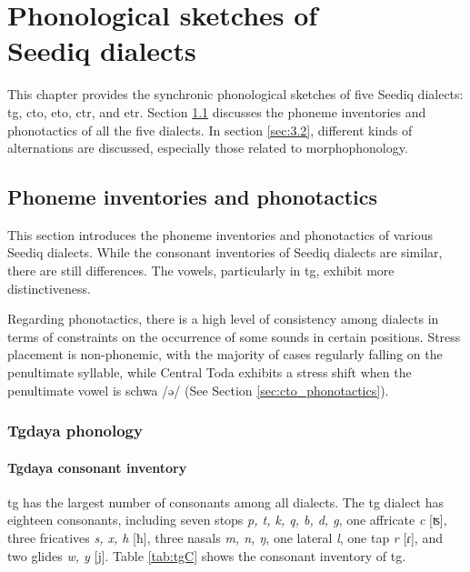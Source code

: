 \chapter[Phonological sketches of Seediq dialects]{Phonological sketches of \\ Seediq dialects}\label{ch3}

This chapter provides the synchronic phonological sketches of five Seediq dialects: \acl{tg}, \acl{cto}, \acl{eto}, \acl{ctr}, and \acl{etr}. Section \ref{sec:3.1} discusses the phoneme inventories and phonotactics of all the five dialects. In section \ref{sec:3.2}, different kinds of alternations are discussed, especially those related to morphophonology.

\section{Phoneme inventories and phonotactics} \label{sec:3.1}

This section introduces the phoneme inventories and phonotactics of various Seediq dialects. While the consonant inventories of Seediq dialects are similar, there are still differences. The vowels, particularly in \acl{tg}, exhibit more distinctiveness.

Regarding phonotactics, there is a high level of consistency among dialects in terms of constraints on the occurrence of some sounds in certain positions. Stress placement is non-phonemic, with the majority of cases regularly falling on the penultimate syllable, while Central Toda exhibits a stress shift when the penultimate vowel is schwa /ə/ (See Section \ref{sec:cto_phonotactics}).

\subsection{Tgdaya phonology}

\subsubsection{Tgdaya consonant inventory} \label{sec:tg_C}

\acl{tg} has the largest number of consonants among all dialects. The \acl{tg} dialect has eighteen consonants, including seven stops \textit{p, t, k, q, b, d, g}, one affricate \textit{c} [ʦ], three fricatives \textit{s, x, h} [ħ], three nasals \textit{m, n, ŋ}, one lateral \textit{l}, one tap \textit{r} [ɾ], and two glides \textit{w, y} [j]. Table \ref{tab:tgC} shows the consonant inventory of \acl{tg}.


